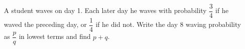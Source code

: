 A student waves on day 1. Each later day he waves with probability $\dfrac{3}{4}$ if he waved the preceding day, or $\dfrac{1}{4}$ if he did not. Write the day 8 waving probability as $\dfrac{p}{q}$ in lowest terms and find $p+q$.
